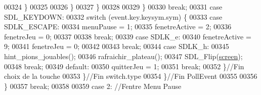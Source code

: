 \begin{DoxyCode}
00324                                                                         \}
00325 
00326                                                                 \}
00327                                                         \}
00328 
00329                                                 \}
00330                                                 \textcolor{keywordflow}{break};
00331                                         \textcolor{keywordflow}{case} SDL\_KEYDOWN:
00332                                                 \textcolor{keywordflow}{switch} (event.key.keysym.sym) \{
00333                                                 \textcolor{keywordflow}{case} SDLK\_ESCAPE:
00334                                                         menuPause = 1;
00335                                                         fenetreActive = 2;
00336                                                         fenetreJeu = 0;
00337 
00338                                                         \textcolor{keywordflow}{break};
00339                                                 \textcolor{keywordflow}{case} SDLK\_e:
00340                                                         fenetreActive = 9;
00341                                                         fenetreJeu = 0;
00342 
00343                                                         \textcolor{keywordflow}{break};
00344                                                 \textcolor{keywordflow}{case} SDLK\_h:
00345                                                         hint\_pions\_jouables();
00346                                                         rafraichir\_plateau();
00347                                                         SDL\_Flip(\hyperlink{fonction_interface_8h_a78fa3957d73de49cb81d047857504218}{screen});
00348                                                         \textcolor{keywordflow}{break};
00349                                                 \textcolor{keywordflow}{default}:
00350                                                         quitterJeu = 1;
00351                                                         \textcolor{keywordflow}{break};
00352                                                 \}\textcolor{comment}{//Fin choix de la touche}
00353                                         \}\textcolor{comment}{//Fin switch.type}
00354                                 \}\textcolor{comment}{//Fin PollEvent}
00355 
00356                         \}
00357                         \textcolor{keywordflow}{break};
00358 
00359                 \textcolor{keywordflow}{case} 2: \textcolor{comment}{//Fentre Menu Pause}

\end{DoxyCode}
